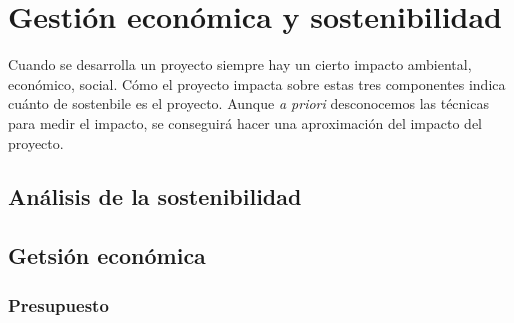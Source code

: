 \section{Gestión económica y sostenibilidad}

Cuando se desarrolla un proyecto siempre hay un cierto impacto ambiental, económico, social. Cómo el proyecto impacta sobre estas tres componentes indica cuánto de sostenbile es el proyecto. Aunque \textit{a priori} desconocemos las técnicas para medir el impacto, se conseguirá hacer una aproximación del impacto del proyecto. 

\subsection{Análisis de la sostenibilidad}

\subsection{Getsión económica}

\subsubsection{Presupuesto}
